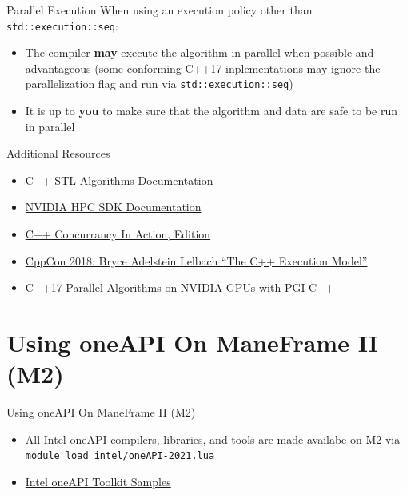 \documentclass[aspectratio=169]{beamer}
\begin{document}
\begin{frame}{Parallel Execution}
When using an execution policy other than \texttt{std::execution::seq}:
\begin{itemize}
  \item The compiler \textbf{may} execute the algorithm in parallel when possible and advantageous (some conforming C++17 inplementations may ignore the parallelization flag and run via \texttt{std::execution::seq})
  \item It is up to \textbf{you} to make sure that the algorithm and data are safe to be run in parallel
\end{itemize}
\end{frame}

\begin{frame}{Additional Resources}
\begin{itemize}
  \item \href{https://en.cppreference.com/w/cpp/algorithm}{C++ STL Algorithms Documentation}
  \item \href{https://docs.nvidia.com/hpc-sdk/compilers/c++-parallel-algorithms/index.html}{NVIDIA HPC SDK Documentation}
  \item \href{https://livebook.manning.com/book/c-plus-plus-concurrency-in-action-second-edition/chapter-10}{C++ Concurrancy In Action,  Edition}
  \item \href{https://www.youtube.com/watch?v=FJIn1YhPJJc}{CppCon 2018: Bryce Adelstein Lelbach ``The C++ Execution Model''}
  \item \href{https://developer.download.nvidia.com/video/gputechconf/gtc/2019/presentation/s9770-c++17-parallel-algorithms-for-nvidia-gpus-with-pgi-c++.pdf}{C++17 Parallel Algorithms on NVIDIA GPUs with PGI C++}
\end{itemize}
\end{frame}


\section{Using oneAPI On ManeFrame II (M2)}

\begin{frame}{Using oneAPI On ManeFrame II (M2)}
\begin{itemize}
  \item All Intel oneAPI compilers, libraries, and tools are made availabe on M2 via \texttt{module load intel/oneAPI-2021.lua}
  \item \href{https://github.com/oneapi-src/oneAPI-samples}{Intel oneAPI Toolkit Samples}
\end{itemize}
\end{frame}
\end{document}
